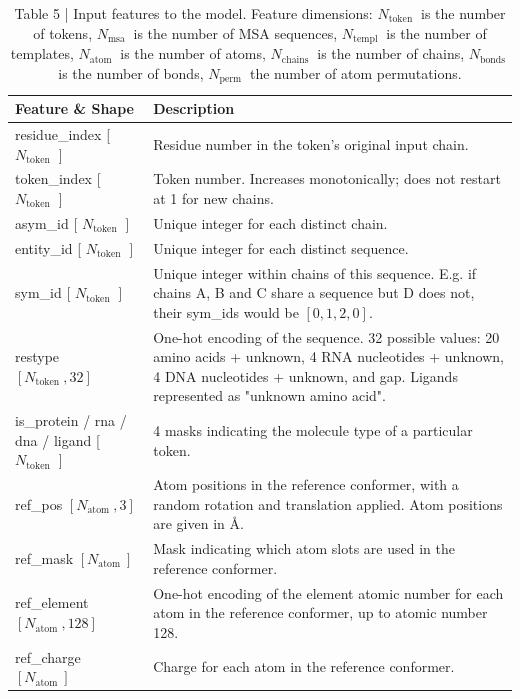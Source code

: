 \documentclass[10pt]{article}
\begin{document}
\begin{table}[h]
\begin{center}
\captionsetup{labelformat=empty}
\caption{Table 5 | Input features to the model. Feature dimensions: $N_{\text {token }}$ is the number of tokens, $N_{\text {msa }}$ is the number of MSA sequences, $N_{\text {templ }}$ is the number of templates, $N_{\text {atom }}$ is the number of atoms, $N_{\text {chains }}$ is the number of chains, $N_{\text {bonds }}$ is the number of bonds, $N_{\text {perm }}$ the number of atom permutations.}
\begin{tabular}{|l|l|}
\hline
Feature \& Shape & Description \\
\hline
residue\_index [ $N_{\text {token }}$ ] & Residue number in the token's original input chain. \\
\hline
token\_index [ $N_{\text {token }}$ ] & Token number. Increases monotonically; does not restart at 1 for new chains. \\
\hline
asym\_id [ $N_{\text {token }}$ ] & Unique integer for each distinct chain. \\
\hline
entity\_id [ $N_{\text {token }}$ ] & Unique integer for each distinct sequence. \\
\hline
sym\_id [ $N_{\text {token }}$ ] & Unique integer within chains of this sequence. E.g. if chains A, B and C share a sequence but D does not, their sym\_ids would be $[0,1,2,0]$. \\
\hline
restype $\left[N_{\text {token }}, 32\right]$ & One-hot encoding of the sequence. 32 possible values: 20 amino acids + unknown, 4 RNA nucleotides + unknown, 4 DNA nucleotides + unknown, and gap. Ligands represented as "unknown amino acid". \\
\hline
is\_protein / rna / dna / ligand [ $N_{\text {token }}$ ] & 4 masks indicating the molecule type of a particular token. \\
\hline
ref\_pos $\left[N_{\text {atom }}, 3\right]$ & Atom positions in the reference conformer, with a random rotation and translation applied. Atom positions are given in Å. \\
\hline
ref\_mask $\left[N_{\text {atom }}\right]$ & Mask indicating which atom slots are used in the reference conformer. \\
\hline
ref\_element $\left[N_{\text {atom }}, 128\right]$ & One-hot encoding of the element atomic number for each atom in the reference conformer, up to atomic number 128. \\
\hline
ref\_charge $\left[N_{\text {atom }}\right]$ & Charge for each atom in the reference conformer. \\
\hline
\end{tabular}
\end{center}
\end{table}
\end{document}
